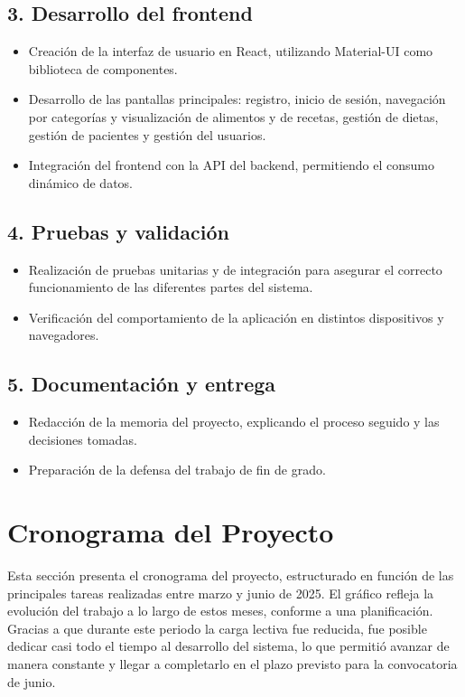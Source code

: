 \subsection*{3. Desarrollo del frontend}
\begin{itemize}
    \item Creación de la interfaz de usuario en React, utilizando Material-UI como biblioteca de componentes.
    \item Desarrollo de las pantallas principales: registro, inicio de sesión, navegación por categorías y visualización de alimentos y de recetas, gestión de dietas, gestión de pacientes y gestión del usuarios.
    \item Integración del frontend con la API del backend, permitiendo el consumo dinámico de datos.
\end{itemize}

\subsection*{4. Pruebas y validación}
\begin{itemize}
    \item Realización de pruebas unitarias y de integración para asegurar el correcto funcionamiento de las diferentes partes del sistema.
    \item Verificación del comportamiento de la aplicación en distintos dispositivos y navegadores.
\end{itemize}

\subsection*{5. Documentación y entrega}
\begin{itemize}
    \item Redacción de la memoria del proyecto, explicando el proceso seguido y las decisiones tomadas.
    \item Preparación de la defensa del trabajo de fin de grado.
\end{itemize}

\section{Cronograma del Proyecto}
Esta sección presenta el cronograma del proyecto, estructurado en función de las principales tareas realizadas entre marzo y junio de 2025. El gráfico refleja la evolución del trabajo a lo largo de estos meses, conforme a una planificación. Gracias a que durante este periodo la carga lectiva fue reducida, fue posible dedicar casi todo el tiempo al desarrollo del sistema, lo que permitió avanzar de manera constante y  llegar a completarlo en el plazo previsto para la convocatoria de junio.

